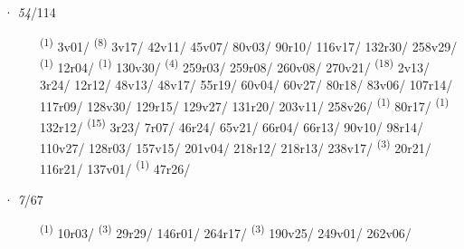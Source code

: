 \ENTRYEND
\noindent{} · \textit{54}/114 \LEMMALINE
\begin{description}
    \item[]  \textsuperscript{(1)} \mbox{3v01/} \textsuperscript{(8)} \mbox{3v17/} \mbox{42v11/} \mbox{45v07/} \mbox{80v03/} \mbox{90r10/} \mbox{116v17/} \mbox{132r30/} \mbox{258v29/} \textsuperscript{(1)} \mbox{12r04/} \textsuperscript{(1)} \mbox{130v30/} \textsuperscript{(4)} \mbox{259r03/} \mbox{259r08/} \mbox{260v08/} \mbox{270v21/} \CASEBREAK {} \textsuperscript{(18)} \mbox{2v13/} \mbox{3r24/} \mbox{12r12/} \mbox{48v13/} \mbox{48v17/} \mbox{55r19/} \mbox{60v04/} \mbox{60v27/} \mbox{80r18/} \mbox{83v06/} \mbox{107r14/} \mbox{117r09/} \mbox{128v30/} \mbox{129r15/} \mbox{129v27/} \mbox{131r20/} \mbox{203v11/} \mbox{258v26/} \textsuperscript{(1)} \mbox{80r17/} \textsuperscript{(1)} \mbox{132r12/} \CASEBREAK {} \textsuperscript{(15)} \mbox{3r23/} \mbox{7r07/} \mbox{46r24/} \mbox{65v21/} \mbox{66r04/} \mbox{66r13/} \mbox{90v10/} \mbox{98r14/} \mbox{110v27/} \mbox{128r03/} \mbox{157v15/} \mbox{201v04/} \mbox{218r12/} \mbox{218r13/} \mbox{238v17/} \textsuperscript{(3)} \mbox{20r21/} \mbox{116r21/} \mbox{137v01/} \textsuperscript{(1)} \mbox{47r26/}
\end{description}
\ENTRYEND
\noindent{} · \textit{7}/67 \LEMMALINE
\begin{description}
    \item[]  \textsuperscript{(1)} \mbox{10r03/} \textsuperscript{(3)} \mbox{29r29/} \mbox{146r01/} \mbox{264r17/} \textsuperscript{(3)} \mbox{190v25/} \mbox{249v01/} \mbox{262v06/}
\end{description}
\ENTRYEND
